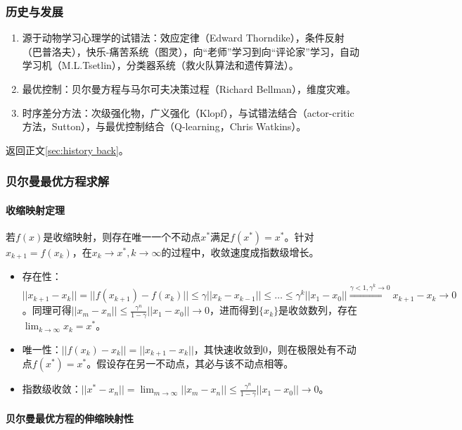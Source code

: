 \documentclass[
12pt, %
a4paper, 
oneside, %
headinclude,footinclude, %
]{scrartcl}
\begin{document}
\subsubsection[历史与发展]{历史与发展}\label{sec:history}
\begin{enumerate}
\item 源于动物学习心理学的试错法：效应定律（Edward Thorndike），条件反射（巴普洛夫），快乐-痛苦系统（图灵），向“老师”学习到向“评论家”学习，自动学习机（M.L.Tsetlin），分类器系统（救火队算法和遗传算法）。
\item 最优控制：贝尔曼方程与马尔可夫决策过程（Richard Bellman），维度灾难。
\item 时序差分方法：次级强化物，广义强化（Klopf），与试错法结合（actor-critic方法，Sutton），与最优控制结合（Q-learning，Chris Watkins）。
\end{enumerate}

返回正文\ref{sec:history back}。
\subsubsection[贝尔曼最优方程求解]{贝尔曼最优方程求解}\label{sec:Scalability Mapping}
\paragraph{收缩映射定理}
若$ f(x) $是收缩映射，则存在唯一一个不动点$ x^* $满足$ f(x^*) = x^* $。针对$ x_{k + 1} = f(x_k) $，在$ x_k \to x^*, k \to \infty $的过程中，收敛速度成指数级增长。
\begin{itemize}
\item 存在性：$ ||x_{k + 1} - x_k|| = ||f(x_{k + 1}) - f(x_k)|| \leq \gamma||x_k - x_{k - 1}|| \leq \dots \leq \gamma^k||x_1 - x_0|| \overset{\gamma < 1, \gamma^k \to 0}{\Longrightarrow} x_{k + 1} - x_k \to 0 $。同理可得$ ||x_m - x_n|| \leq \frac{\gamma^n}{1 - \gamma}||x_1 - x_0|| \to 0 $，进而得到$ \{x_k\} $是收敛数列，存在$ \lim_{k \to \infty} x_k = x^* $。
\item 唯一性：$ ||f(x_k) - x_k|| = ||x_{k + 1} - x_k|| $，其快速收敛到$ 0 $，则在极限处有不动点$ f(x^*) = x^* $。假设存在另一不动点，其必与该不动点相等。
\item 指数级收敛：$ ||x^* - x_n|| = \lim_{m \to \infty}||x_m - x_n|| \leq \frac{\gamma^n}{1 - \gamma}||x_1 - x_0|| \to 0 $。
\end{itemize}
\paragraph{贝尔曼最优方程的伸缩映射性}~\\
\end{document}
